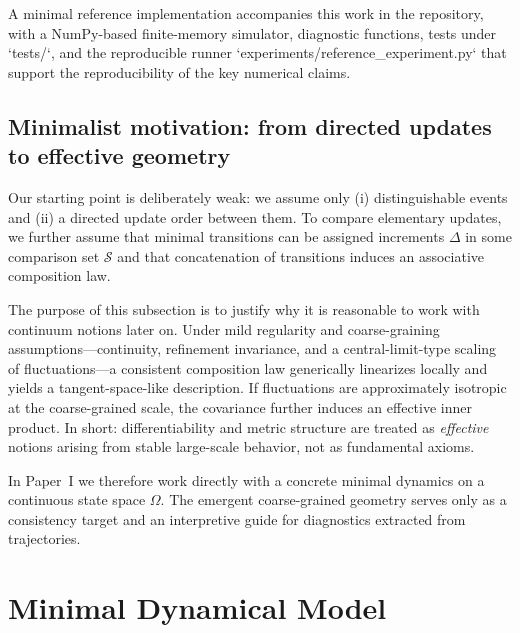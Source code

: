 \documentclass[reprint,amsmath,amssymb,aps,prd,nofootinbib,floatfix]{revtex4-2}
\begin{document}
A minimal reference implementation accompanies this work in the repository, with a NumPy-based finite-memory simulator, diagnostic functions, tests under `tests/`, and the reproducible runner `experiments/reference_experiment.py` that support the reproducibility of the key numerical claims.

\subsection{Minimalist motivation: from directed updates to effective geometry}\label{sec:minimalist_motivation}

Our starting point is deliberately weak: we assume only (i) distinguishable events and (ii) a directed update order between them.
To compare elementary updates, we further assume that minimal transitions can be assigned increments $\Delta$ in some comparison set $\mathcal{S}$ and that concatenation of transitions induces an associative composition law.

The purpose of this subsection is to justify why it is reasonable to work with continuum notions later on.
Under mild regularity and coarse-graining assumptions---continuity, refinement invariance, and a central-limit-type scaling of fluctuations---a consistent composition law generically linearizes locally and yields a tangent-space-like description.
If fluctuations are approximately isotropic at the coarse-grained scale, the covariance further induces an effective inner product.
In short: differentiability and metric structure are treated as \emph{effective} notions arising from stable large-scale behavior, not as fundamental axioms.

In Paper~I we therefore work directly with a concrete minimal dynamics on a continuous state space $\Omega$.
The emergent coarse-grained geometry serves only as a consistency target and an interpretive guide for diagnostics extracted from trajectories.


\section{Minimal Dynamical Model}\label{sec:MinDynModel}
\end{document}
